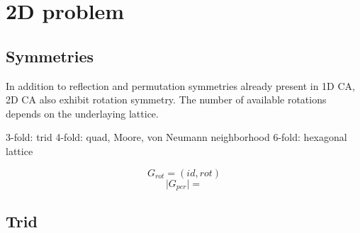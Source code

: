 \documentclass{ijuc}
\begin{document}
\section{2D problem}

\subsection{Symmetries}

In addition to reflection and permutation symmetries already present in 1D CA,
2D CA also exhibit rotation symmetry. The number of available rotations depends
on the underlaying lattice.

3-fold: trid
4-fold: quad, Moore, von Neumann neighborhood
6-fold: hexagonal lattice

\[ G_{rot} = (id, rot) \]
\[ \vert G_{per} \vert =  \]

\subsection{Trid}
\end{document}
